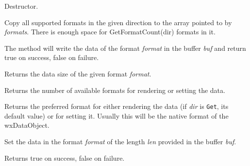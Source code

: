
Destructor.

\label{wxdataobjectgetallformats}


Copy all supported formats in the given direction to the array pointed to by 
{\it formats}. There is enough space for GetFormatCount(dir) formats in it.


\label{wxdataobjectgetdatahere}


The method will write the data of the format {\it format} in the buffer {\it
buf} and return true on success, false on failure.

\label{wxdataobjectgetdatasize}


Returns the data size of the given format {\it format}.

\label{wxdataobjectgetformatcount}


Returns the number of available formats for rendering or setting the data.

\label{wxdataobjectgetpreferredformat}


Returns the preferred format for either rendering the data (if {\it dir} is {\tt Get},
its default value) or for setting it. Usually this will be the
native format of the wxDataObject.

\label{wxdataobjectsetdata}


Set the data in the format {\it format} of the length {\it len} provided in the
buffer {\it buf}.

Returns true on success, false on failure.

